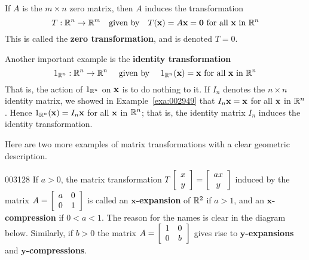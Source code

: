 If $A$ is the $m \times n$ zero matrix, then $A$ induces the transformation
\begin{equation*}
T : \mathbb{R}^{n} \to \mathbb{R}^{m} \quad \mbox{given by} \quad T(\textbf{x}) = A\textbf{x} = \textbf{0} \mbox{ for all } \textbf{x} \mbox{ in } \mathbb{R}^{n}
\end{equation*}
This is called the \textbf{zero transformation}, and is denoted $T = 0$.


Another important example is the \textbf{identity transformation}
\begin{equation*}
1_{\mathbb{R}^{n}} : \mathbb{R}^{n} \to \mathbb{R}^{n} \quad \mbox{ given by } \quad 1_{\mathbb{R}^{n}}(\textbf{x}) = \textbf{x} \mbox{ for all } \textbf{x} \mbox{ in } \mathbb{R}^{n}
\end{equation*}
That is, the action of $1_{\mathbb{R}^n}$ on $\textbf{x}$ is to do nothing to it. If $I_{n}$ denotes the $n \times n$ identity matrix, we showed in Example~\ref{exa:002949} that $I_{n} \textbf{x} = \textbf{x}$ for all $\textbf{x}$ in $\mathbb{R}^n$. Hence $1_{\mathbb{R}^n}(\textbf{x}) = I_{n}\textbf{x}$ for all $\textbf{x}$ in $\mathbb{R}^n$; that is, the identity matrix $I_{n}$ induces the identity transformation.


Here are two more examples of matrix transformations with a clear geometric description.


\begin{example}{}{003128}
If $a > 0$, the matrix transformation $T \left[ \begin{array}{c}
x \\
y
\end{array} \right] = \left[ \begin{array}{c}
ax \\
y
\end{array} \right]$
 induced by the matrix $A = \left[ \begin{array}{cc}
 a & 0 \\
 0 & 1
 \end{array} \right]$
 is called an $\bm{x}$\textbf{-expansion} of $\mathbb{R}^2$ if $a > 1$, and an $\bm{x}$\textbf{-compression} if $0 < a < 1$. The reason for the names is clear in the diagram below. Similarly, if $b > 0$ the matrix $A = \left[ \begin{array}{cc}
1 & 0 \\
0 & b
\end{array} \right]$
 gives rise to $\bm{y}$\textbf{-expansions} and $\bm{y}$\textbf{-compressions}.


\begin{center}

\end{center}
\end{example}

